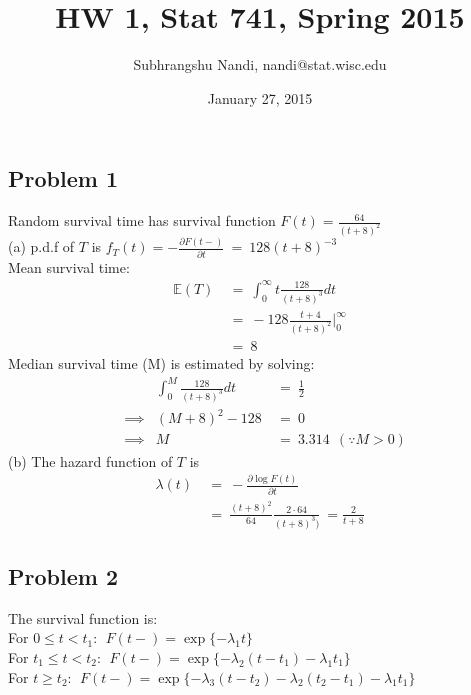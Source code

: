 \documentclass[11pt]{extarticle} %
\newcommand{\Exp}{\mathds{E}}
\begin{document}

\title{HW 1, Stat 741, Spring 2015}
\author{Subhrangshu Nandi, nandi@stat.wisc.edu}
\date{January 27, 2015}

\maketitle

\subsection*{Problem 1}
\noindent
Random survival time has survival function $F(t) = \frac{64}{(t+8)^2}$\\
(a) p.d.f of $T$ is $f_T(t) = -\frac{\partial F(t-)}{\partial t}\ =\ 128(t+8)^{-3}$ \\
Mean survival time:
\begin{align}
\Exp(T)\ &{=}\ \int_0^{\infty} t\frac{128}{(t+8)^3}dt \nonumber \\
       \ &{=}\ -128\frac{t + 4}{(t+8)^2}\biggl|_0^{\infty} \nonumber \\
       \ &{=}\ 8 \nonumber
\end{align}
Median survival time (M) is estimated by solving: 
\begin{align}
& & \int_0^M\frac{128}{(t+8)^3}dt\ &{=}\ \frac{1}{2} \nonumber \\
&{\implies} & (M+8)^2 - 128 \ &{=}\ 0 \nonumber \\
&{\implies} &  M \ &{=}\ 3.314\ \  (\because M > 0) \nonumber
\end{align}
(b) The hazard function of $T$ is 
\begin{align*}
\lambda(t)\ &{=}\ -\frac{\partial \log F(t)}{\partial t} \\
\ &{=}\ \frac{(t+8)^2}{64} \frac{2 \cdot 64}{(t+8)^3)} \ = \frac{2}{t+8}
\end{align*}


\subsection*{Problem 2}
\noindent
The survival function is: \\
For $0 \leq t < t_1: \ \  F(t-) = \exp\{-\lambda_1 t \}$ \\
For $t_1 \leq t < t_2: \ \  F(t-) = \exp\{-\lambda_2(t - t_1)-\lambda_1 t_1 \}$ \\
For $t \geq t_2: \ \  F(t-) = \exp\{-\lambda_3(t - t_2) - \lambda_2(t_2 - t_1)-\lambda_1 t_1 \}$ \\
\end{document}
